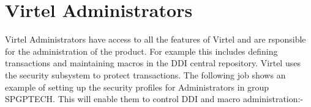 \documentclass[letterpaper,10pt,english]{sphinxmanual}
\begin{document}

\newpage

\ignorespaces 

\section{Virtel Administrators}
\label{\detokenize{Installation_Guide:virtel-administrators}}\label{\detokenize{Installation_Guide:index-181}}
Virtel Administrators have access to all the features of Virtel and are rsponsible for the administration of the product. For example this includes defining transactions and maintaining macros in the DDI central repository. Virtel uses the security subsystem to protect transactions. The following job shows an example of setting up the security profiles for Administrators in group SPGPTECH. This will enable them to control DDI and macro administration:-
\end{document}
